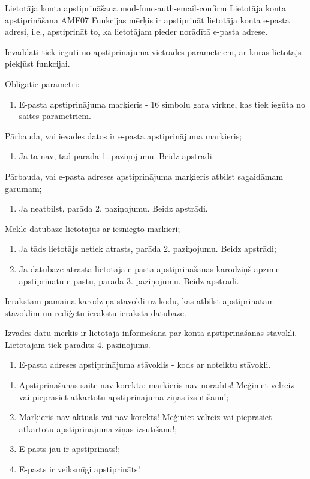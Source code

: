 \moduleFunctionTable
{Lietotāja konta apstiprināšana}
{mod-func-auth-email-confirm}
{Lietotāja konta apstiprināšana}
{AMF07}
{
	Funkcijas mērķis ir apstiprināt lietotāja konta e-pasta adresi, i.e., apstiprināt to, ka lietotājam pieder norādītā e-pasta adrese.
}
{
	Ievaddati tiek iegūti no apstiprinājuma vietrādes parametriem, ar kuras lietotājs piekļūst funkcijai.

	Obligātie parametri:
	\begin{enumerate}
		\item E-pasta apstiprinājuma marķieris - 16 simbolu gara virkne, kas tiek iegūta no saites parametriem.
	\end{enumerate}

}
{
	\item Pārbauda, vai ievades datos ir e-pasta apstiprinājuma marķieris;
	\begin{enumerate}
		\item Ja tā nav, tad parāda 1. paziņojumu. Beidz apstrādi.
	\end{enumerate}
	\item Pārbauda, vai e-pasta adreses apstiprinājuma marķieris atbilst sagaidāmam garumam;
	\begin{enumerate}
		\item Ja neatbilst, parāda 2. paziņojumu. Beidz apstrādi.
	\end{enumerate}
	\item Meklē datubāzē lietotājus ar iesniegto marķieri;
	\begin{enumerate}
		\item Ja tāds lietotājs netiek atrasts, parāda 2. paziņojumu. Beidz apstrādi;
		\item Ja datubāzē atrastā lietotāja e-pasta apstiprināšanas karodziņš apzīmē apstiprinātu e-pastu, parāda 3. paziņojumu. Beidz apstrādi.
	\end{enumerate}
	\item Ierakstam pamaina karodziņa stāvokli uz kodu, kas atbilst apstiprinātam stāvoklim un rediģētu ierakstu ieraksta datubāzē.
}
{
	Izvades datu mērķis ir lietotāja informēšana par konta apstiprināšanas stāvokli. Lietotājam tiek parādīts 4. paziņojums.
	\begin{enumerate}
		\item E-pasta adreses apstiprinājuma stāvoklis - kods ar noteiktu stāvokli.
	\end{enumerate}
}
{
	\begin{enumerate}
		\item Apstiprināšanas saite nav korekta: marķieris nav norādīts! Mēģiniet vēlreiz vai pieprasiet atkārtotu apstiprinājuma ziņas izsūtīšanu!;
		\item Marķieris nav aktuāls vai nav korekts! Mēģiniet vēlreiz vai pieprasiet atkārtotu apstiprinājuma ziņas izsūtīšanu!;
		\item E-pasts jau ir apstiprināts!;
		\item E-pasts ir veiksmīgi apstiprināts!
	\end{enumerate}
}

